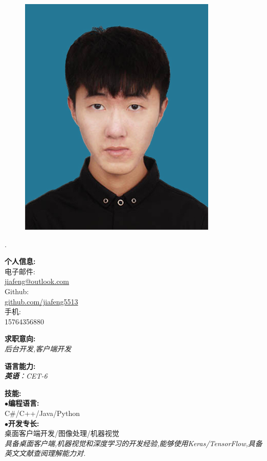 \documentclass[a4paper,12pt,final]{memoir}
\newcommand{\myThemeColor}{RoyalBlue}
\newcommand{\SmallSep}{\vspace{0.9em}}
\newcommand{\CVItem}[1]
	{\textbf{\color{\myThemeColor} #1}}
\begin{document}
\begin{CJK*}{UTF8}{gbsn}%
\begin{figure}
	\hfill
	\includegraphics[width=0.8\columnwidth]{photo}
	\vspace{-7cm}
\end{figure}
\begin{flushright}\footnotesize
.\\
\vskip 6cm
    \raggedright
	\CVItem{{\large 个人信息:}}\\
	电子邮件:\\
	\href{mailto:jiafeng@outlook.com}{jiafeng@outlook.com}  \\
	Github:\\
	\href{github.com/jiafeng5513}{github.com/jiafeng5513} \\
	手机:\\
	15764356880
	\SmallSep
	\SmallSep

	\CVItem{{\large 求职意向:}}\\
	\textit{后台开发,客户端开发\\ }
	\SmallSep

	\CVItem{{\large 语言能力:}}\\
	\textit{\textbf{英语}：CET-6\\ }
	\SmallSep

	\CVItem{{\large 技能:}}\\
	$\bullet$\textbf{编程语言:}\\ C\#/C++/Java/Python\\
	$\bullet$\textbf{开发专长:}\\ 桌面客户端开发/图像处理/机器视觉 \\
	\SmallSep
	\textit{具备桌面客户端,机器视觉和深度学习的开发经验,能够使用Keras/TensorFlow,具备英文文献查阅理解能力对.}
	

\end{flushright}
\end{CJK*}
\end{document}
